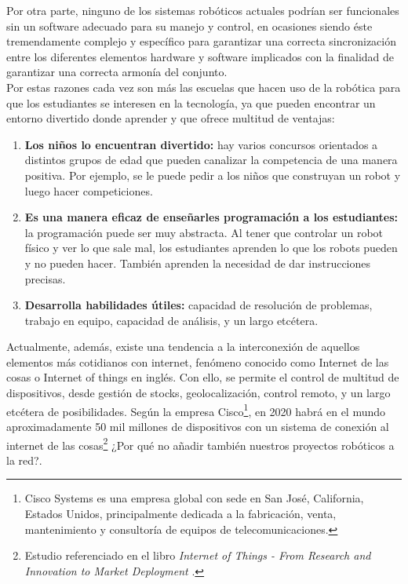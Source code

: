 Por otra parte, ninguno de los sistemas robóticos actuales podrían ser funcionales sin un software adecuado para su manejo y control, en ocasiones siendo éste tremendamente complejo y específico para garantizar
una correcta sincronización entre los diferentes elementos hardware y software implicados con la finalidad de garantizar una correcta armonía del conjunto.\\

Por estas razones cada vez son más las escuelas que hacen uso de la robótica para que los estudiantes se interesen en la tecnología, ya que pueden encontrar un entorno divertido donde aprender y que ofrece multitud de ventajas:\\

\begin{enumerate}
\item \textbf{Los niños lo encuentran divertido:} hay varios concursos orientados a distintos grupos de edad que pueden canalizar la competencia de una manera positiva. Por ejemplo, se le puede pedir a los niños que construyan un robot y luego hacer competiciones.\\
\item \textbf{Es una manera eficaz de enseñarles programación a los estudiantes:}
 la programación puede ser muy abstracta. Al tener que controlar un robot físico y ver lo que sale mal, los estudiantes aprenden lo que los robots pueden y no pueden hacer. 
También aprenden la necesidad de dar instrucciones precisas.\\
\item \textbf{ Desarrolla habilidades útiles:}
 capacidad de resolución de problemas, trabajo en equipo, capacidad de análisis, y un largo etcétera.
\end{enumerate}


Actualmente, además, existe una tendencia a la interconexión de aquellos elementos más cotidianos con internet, fenómeno conocido como Internet de las cosas o Internet of things en inglés. Con ello,
se permite el control de multitud de dispositivos, desde gestión de stocks, geolocalización, control remoto, y un largo etcétera de posibilidades. Según la empresa Cisco\footnote{Cisco Systems es 
una empresa global con sede en San José, California, Estados Unidos, principalmente dedicada a la fabricación, venta, mantenimiento y consultoría de equipos de telecomunicaciones.}, en 2020 habrá en
el mundo aproximadamente 50 mil millones de dispositivos con un sistema de conexión al internet de las cosas\footnote{ Estudio referenciado en el libro \textit{Internet of Things - From Research and Innovation to Market Deployment} 
\cite{book:internet_things}.} ¿Por qué no añadir también nuestros proyectos robóticos a la red?.\\

